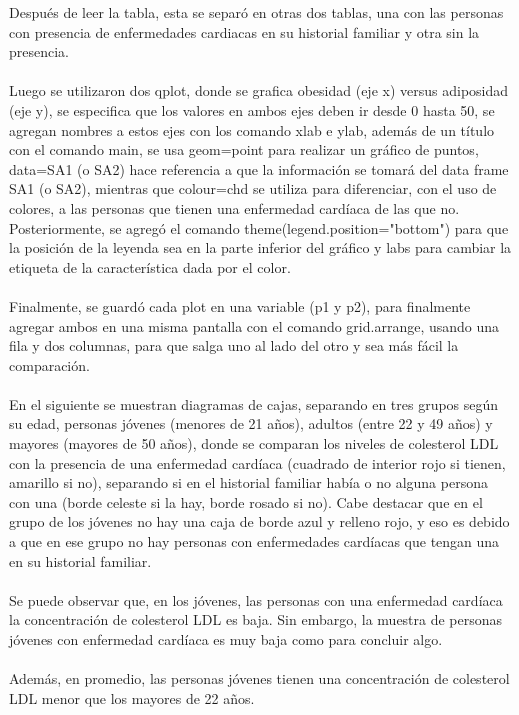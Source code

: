\documentclass[11pt,a4paper]{article}
\begin{document}
\begin{itemize}
Después de leer la tabla, esta se separó en otras dos tablas, una con las personas con presencia de enfermedades cardiacas en su historial familiar y otra sin la presencia.\\
\\
Luego se utilizaron dos qplot, donde se grafica obesidad (eje x) versus adiposidad (eje y), se especifica que los valores en ambos ejes deben ir desde 0 hasta 50, se agregan nombres a estos ejes con los comando xlab e ylab, además de un título con el comando main, se usa geom=point para realizar un gráfico de puntos, data=SA1 (o SA2) hace referencia a que la información se tomará del data frame SA1 (o SA2), mientras que colour=chd se utiliza para diferenciar, con el uso de colores, a las personas que tienen una enfermedad cardíaca de las que no. Posteriormente, se agregó el  comando theme(legend.position="bottom") para que la posición de la leyenda sea en la parte inferior del gráfico y labs para cambiar la etiqueta de la característica dada por el color.\\
\\
Finalmente, se guardó cada plot en una variable (p1 y p2), para finalmente agregar ambos en una misma pantalla con el comando grid.arrange, usando una fila y dos columnas, para que salga uno al lado del otro y sea más fácil la comparación.
\\
\\
En el siguiente se muestran diagramas de cajas, separando en tres grupos según su edad, personas jóvenes (menores de 21 años), adultos (entre 22 y 49 años) y mayores (mayores de 50 años), donde se comparan los niveles de colesterol LDL con la presencia de una enfermedad cardíaca (cuadrado de interior rojo si tienen, amarillo si no), separando si en el historial familiar había o no alguna persona con una (borde celeste si la hay, borde rosado si no). Cabe destacar que en el grupo de los jóvenes no hay una caja de borde azul y relleno rojo, y eso es debido a que en ese grupo no hay personas con enfermedades cardíacas que tengan una en su historial familiar.\\
\\
Se puede observar que, en los jóvenes, las personas con una enfermedad cardíaca la concentración de colesterol LDL es baja. Sin embargo, la muestra de personas jóvenes con enfermedad cardíaca es muy baja como para concluir algo.\\
\\
Además, en promedio, las personas jóvenes tienen una concentración de colesterol LDL menor que los mayores de 22 años.\\

\end{itemize}
\end{document}
